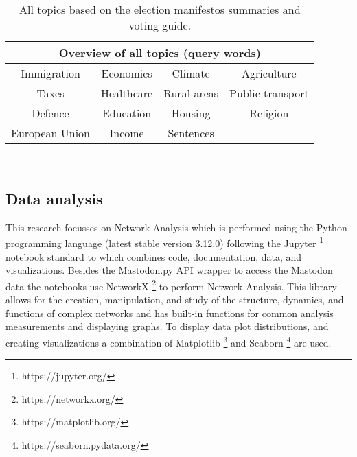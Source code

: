 \begin{table}
\begin{center}
\begin{tabular}{||c c c c||} 
 \hline
 \multicolumn{4}{|c|}{\textbf{Overview of all topics (query words)}} \\
 \hline
 Immigration & Economics & Climate & Agriculture \\
 \hline
 Taxes & Healthcare & Rural areas & Public transport \\
 \hline
 Defence & Education & Housing & Religion \\
 \hline
 European Union & Income & Sentences &  \\
 \hline
 
\end{tabular}
\\
\caption{\label{topic-table}All topics based on the election manifestos summaries and voting guide.}
\end{center}
\end{table}

\subsection{Data analysis}

This research focusses on Network Analysis which is performed using the Python programming language (latest stable version 3.12.0) following the Jupyter \footnote{https://jupyter.org/} notebook standard to which combines code, documentation, data, and visualizations. Besides the Mastodon.py API wrapper to access the Mastodon data the notebooks use NetworkX \footnote{https://networkx.org/} to perform Network Analysis. This library allows for the creation, manipulation, and study of the structure, dynamics, and functions of complex networks and has built-in functions for common analysis measurements and displaying graphs. To display data  plot distributions, and creating visualizations a combination of Matplotlib \footnote{https://matplotlib.org/} and Seaborn \footnote{https://seaborn.pydata.org/} are used.